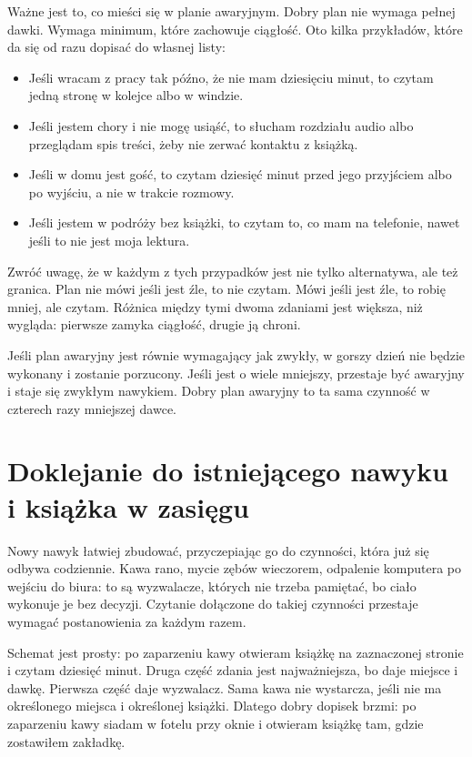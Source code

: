 Ważne jest to, co mieści się w planie awaryjnym. Dobry plan nie wymaga pełnej dawki. Wymaga minimum, które zachowuje ciągłość. Oto kilka przykładów, które da się od razu dopisać do własnej listy:

\begin{itemize}
  \item Jeśli wracam z pracy tak późno, że nie mam dziesięciu minut, to czytam jedną stronę w kolejce albo w windzie.
  \item Jeśli jestem chory i nie mogę usiąść, to słucham rozdziału audio albo przeglądam spis treści, żeby nie zerwać kontaktu z książką.
  \item Jeśli w domu jest gość, to czytam dziesięć minut przed jego przyjściem albo po wyjściu, a nie w trakcie rozmowy.
  \item Jeśli jestem w podróży bez książki, to czytam to, co mam na telefonie, nawet jeśli to nie jest moja lektura.
\end{itemize}

Zwróć uwagę, że w każdym z tych przypadków jest nie tylko alternatywa, ale też granica. Plan nie mówi \glqq jeśli jest źle, to nie czytam\grqq{}. Mówi \glqq jeśli jest źle, to robię mniej, ale czytam\grqq{}. Różnica między tymi dwoma zdaniami jest większa, niż wygląda: pierwsze zamyka ciągłość, drugie ją chroni.

\begin{zasada}
  Jeśli plan awaryjny jest równie wymagający jak zwykły, w gorszy dzień nie będzie wykonany i zostanie porzucony. Jeśli jest o wiele mniejszy, przestaje być awaryjny i staje się zwykłym nawykiem. Dobry plan awaryjny to ta sama czynność w czterech razy mniejszej dawce.
\end{zasada}

\section{Doklejanie do istniejącego nawyku i książka w zasięgu}

Nowy nawyk łatwiej zbudować, przyczepiając go do czynności, która już się odbywa codziennie. Kawa rano, mycie zębów wieczorem, odpalenie komputera po wejściu do biura: to są wyzwalacze, których nie trzeba pamiętać, bo ciało wykonuje je bez decyzji. Czytanie dołączone do takiej czynności przestaje wymagać postanowienia za każdym razem.

Schemat jest prosty: \glqq po zaparzeniu kawy otwieram książkę na zaznaczonej stronie i czytam dziesięć minut\grqq{}. Druga część zdania jest najważniejsza, bo daje miejsce i dawkę. Pierwsza część daje wyzwalacz. Sama kawa nie wystarcza, jeśli nie ma określonego miejsca i określonej książki. Dlatego dobry dopisek brzmi: \glqq po zaparzeniu kawy siadam w fotelu przy oknie i otwieram książkę tam, gdzie zostawiłem zakładkę\grqq{}.

